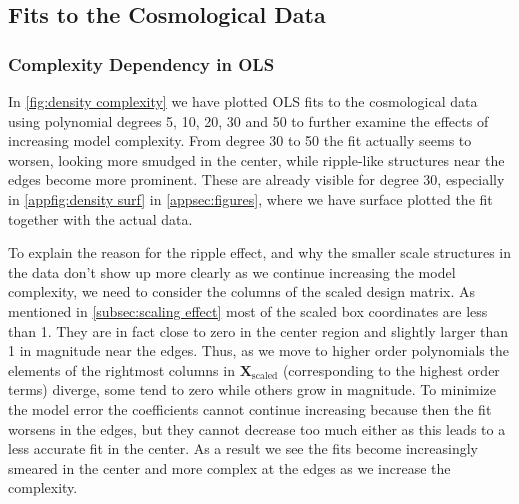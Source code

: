 \documentclass[aps,pra,english,notitlepage,reprint,nofootinbib]{revtex4-1}  %
\begin{document}
\subsection{Fits to the Cosmological Data}
\subsubsection{Complexity Dependency in OLS}
In \cref{fig:density complexity} we have plotted OLS fits to the cosmological data using polynomial degrees 5, 10, 20, 30 and 50 to further examine the effects of increasing model complexity. From degree 30 to 50 the fit actually seems to worsen, looking more smudged in the center, while ripple-like structures near the edges become more prominent. These are already visible for degree 30, especially in \cref{appfig:density surf} in \cref{appsec:figures}, where we have surface plotted the fit together with the actual data.

To explain the reason for the ripple effect, and why the smaller scale structures in the data don't show up more clearly as we continue increasing the model complexity, we need to consider the columns of the scaled design matrix. As mentioned in \cref{subsec:scaling effect} most of the scaled box coordinates are less than 1. They are in fact close to zero in the center region and slightly larger than 1 in magnitude near the edges. Thus, as we move to higher order polynomials the elements of the rightmost columns in $\mathbf{X}_\text{scaled}$ (corresponding to the highest order terms) diverge, some tend to zero while others grow in magnitude. To minimize the model error the coefficients cannot continue increasing because then the fit worsens in the edges, but they cannot decrease too much either as this leads to a less accurate fit in the center. As a result we see the fits become increasingly smeared in the center and more complex at the edges as we increase the complexity.
\end{document}
